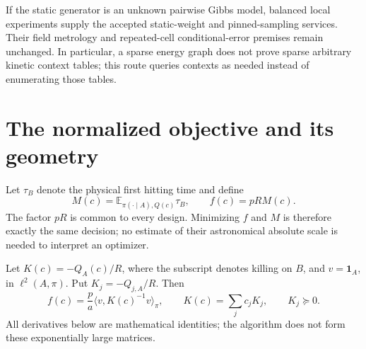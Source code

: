 \documentclass[11pt]{article}
\newcommand{\E}{\mathbb E}
\newcommand{\one}{\mathbf1}
\begin{document}
If the static generator is an unknown pairwise Gibbs model, balanced
local experiments supply the accepted static-weight and pinned-sampling
services. Their field metrology and repeated-cell conditional-error
premises remain unchanged. In particular, a sparse energy graph does not
prove sparse arbitrary kinetic context tables; this route queries contexts
as needed instead of enumerating those tables.

\section{The normalized objective and its geometry}
Let $\tau_B$ denote the physical first hitting time and define
\[
 M(c)=\E_{\pi(\cdot\mid A),Q(c)}\tau_B,
 \qquad f(c)=pR M(c).
\]
The factor $pR$ is common to every design. Minimizing $f$ and $M$ is
therefore exactly the same decision; no estimate of their astronomical
absolute scale is needed to interpret an optimizer.

Let $K(c)=-Q_A(c)/R$, where the subscript denotes killing on $B$,
and $v=\one_A$, in $\ell^2(A,\pi)$. Put $K_j=-Q_{j,A}/R$.
Then
\begin{equation}
 f(c)=\frac pa\langle v,K(c)^{-1}v\rangle_\pi,
 \qquad K(c)=\sum_jc_jK_j,\qquad K_j\succeq0.
 \label{eq:objective}
\end{equation}
All derivatives below are mathematical identities; the algorithm does
not form these exponentially large matrices.
\end{document}

